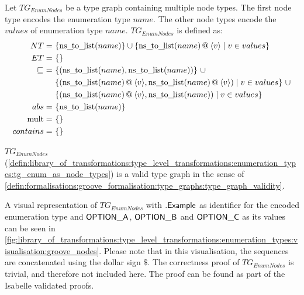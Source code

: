 \begin{defin}
\label{defin:library_of_transformations:type_level_transformations:enumeration_types:tg_enum_as_node_types}
Let $TG_{EnumNodes}$ be a type graph containing multiple node types. The first node type encodes the enumeration type $name$. The other node types encode the $values$ of enumeration type $name$. $TG_{EnumNodes}$ is defined as:
\begin{align*}
NT =\ &\{\mathrm{ns\_\!to\_\!list}(name)\} \cup \{ \mathrm{ns\_\!to\_\!list}(name) \append \langle v \rangle \mid v \in values \} \\
ET =\ &\{\} \\
\!\!\sqsubseteq\ =\ &\{(\mathrm{ns\_\!to\_\!list}(name), \mathrm{ns\_\!to\_\!list}(name))\}\ \cup \\&
\{(\mathrm{ns\_\!to\_\!list}(name) \append \langle v \rangle, \mathrm{ns\_\!to\_\!list}(name) \append \langle v \rangle) \mid v \in values \}\ \cup \\&
\{(\mathrm{ns\_\!to\_\!list}(name) \append \langle v \rangle, \mathrm{ns\_\!to\_\!list}(name)) \mid v \in values \} \\
abs =\ &\{\mathrm{ns\_\!to\_\!list}(name)\} \\
\mathrm{mult} =\ &\{\} \\
contains =\ &\{\}
\end{align*}
\end{defin}

\begin{thm}
\label{defin:library_of_transformations:type_level_transformations:enumeration_types:tg_enum_as_node_types_correct}
$TG_{EnumNodes}$ (\cref{defin:library_of_transformations:type_level_transformations:enumeration_types:tg_enum_as_node_types}) is a valid type graph in the sense of \cref{defin:formalisations:groove_formalisation:type_graphs:type_graph_validity}.
\end{thm}

A visual representation of $TG_{EnumNodes}$ with $.\mathsf{Example}$ as identifier for the encoded enumeration type and $\mathsf{OPTION\_A}$, $\mathsf{OPTION\_B}$ and $\mathsf{OPTION\_C}$ as its values can be seen in \cref{fig:library_of_transformations:type_level_transformations:enumeration_types:visualisation:groove_nodes}. Please note that in this visualisation, the sequences are concatenated using the dollar sign $\$$. The correctness proof of $TG_{EnumNodes}$ is trivial, and therefore not included here. The proof can be found as part of the Isabelle validated proofs.

